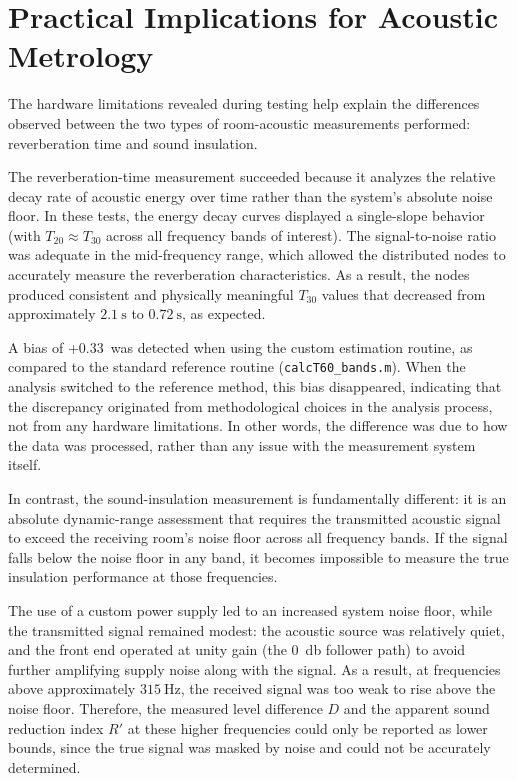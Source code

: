 \section{Practical Implications for Acoustic Metrology}

The hardware limitations revealed during testing help explain the differences observed between the two types of room-acoustic measurements performed: reverberation time and sound insulation.

The reverberation-time measurement succeeded because it analyzes the relative decay rate of acoustic energy over time rather than the system's absolute noise floor. In these tests, the energy decay curves displayed a single-slope behavior (with $T_{20} \approx T_{30}$ across all frequency bands of interest). The signal-to-noise ratio was adequate in the mid-frequency range, which allowed the distributed nodes to accurately measure the reverberation characteristics. As a result, the nodes produced consistent and physically meaningful $T_{30}$ values that decreased from approximately $\SI{2.1}{\second}$ to $\SI{0.72}{\second}$, as expected.

A bias of +0.33~\seconds was detected when using the custom estimation routine, as compared to the standard reference routine (\texttt{calcT60\_bands.m}). When the analysis switched to the reference method, this bias disappeared, indicating that the discrepancy originated from methodological choices in the analysis process, not from any hardware limitations. In other words, the difference was due to how the data was processed, rather than any issue with the measurement system itself.

In contrast, the sound-insulation measurement is fundamentally different: it is an absolute dynamic-range assessment that requires the transmitted acoustic signal to exceed the receiving room’s noise floor across all frequency bands. If the signal falls below the noise floor in any band, it becomes impossible to measure the true insulation performance at those frequencies.

The use of a custom power supply led to an increased system noise floor, while the transmitted signal remained modest: the acoustic source was relatively quiet, and the front end operated at unity gain (the \SI{0}{\decibel} follower path) to avoid further amplifying supply noise along with the signal. As a result, at frequencies above approximately $\SI{315}{\hertz}$, the received signal was too weak to rise above the noise floor. Therefore, the measured level difference $D$ and the apparent sound reduction index $R'$ at these higher frequencies could only be reported as lower bounds, since the true signal was masked by noise and could not be accurately determined.

